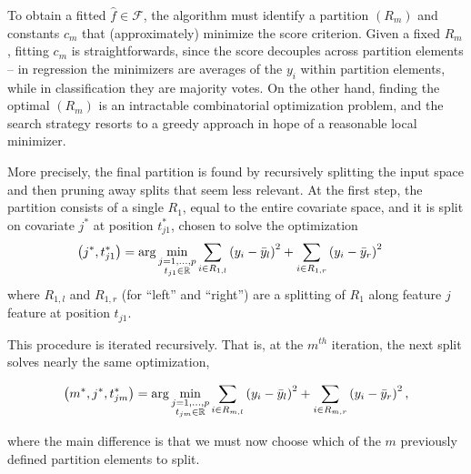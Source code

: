 \documentclass[14pt]{extreport}
\begin{document}
To obtain a fitted $\hat{f} \in \mathcal{F}$, the algorithm must identify a
partition $\left(R_{m}\right)$ and constants $c_{m}$ that (approximately)
minimize the score criterion. Given a fixed $R_{m}$, fitting $c_{m}$ is
straightforwards, since the score decouples across partition elements -- in
regression the minimizers are averages of the $y_{i}$ within partition elements,
while in classification they are majority votes. On the other hand, finding the
optimal $\left(R_{m}\right)$ is an intractable combinatorial optimization
problem, and the search strategy resorts to a greedy approach in hope of a
reasonable local minimizer.

More precisely, the final partition is found by recursively splitting the input
space and then pruning away splits that seem less relevant. At the first step,
the partition consists of a single $R_{1}$, equal to the entire covariate space,
and it is split on covariate $j^{\ast}$ at position $t_{j1}^{\ast}$, chosen to
solve the optimization
\begin{align*}
  \left(j^{\ast}, t_{j1}^{\ast}\right) &= \arg \min_{\substack{j = 1, \dots, p \\ t_{j1} \in \mathbb{R}}} \sum_{i \in R_{1, l}} \left(y_{i} - \bar{y}_{l}\right)^{2} + \sum_{i \in R_{1, r}} \left(y_{i} - \bar{y}_{r}\right)^{2}
\end{align*}
where $R_{1, l}$ and $R_{1, r}$ (for ``left'' and ``right'') are a splitting of
$R_{1}$ along feature $j$ feature at position $t_{j1}$.

This procedure is iterated recursively. That is, at the $m^{th}$ iteration, the
next split solves nearly the same optimization,

\begin{align*}
  \left(m^{\ast}, j^{\ast}, t_{jm}^{\ast}\right) = \arg \min_{\substack{j = 1, \dots, p \\ t_{jm} \in \mathbb{R}}}
  \sum_{i \in R_{m, l}} \left(y_{i} - \bar{y}_{l}\right)^{2} +
  \sum_{i \in R_{m, r}} \left(y_{i} - \bar{y}_{r}\right)^{2},
\end{align*}

where the main difference is that we must now choose which of the $m$ previously
defined partition elements to split.
\end{document}
